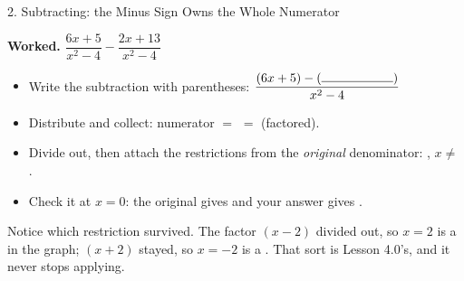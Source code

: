 \documentclass[10pt]{article}
\begin{document}
\begin{notesbox}{2. Subtracting: the Minus Sign Owns the Whole Numerator}
\begin{center}
\end{center}

\vspace{4pt}
\textbf{Worked.} \; $\dfrac{6x+5}{x^2-4}-\dfrac{2x+13}{x^2-4}$
\begin{itemize}[leftmargin=1.5em, itemsep=3pt]
  \item Write the subtraction with parentheses: $\dfrac{(6x+5)-(\rule{2.0cm}{0.4pt})}{x^2-4}$
  \item Distribute and collect: numerator $=$ \blank{3.0cm} $=$ \blank{2.4cm} (factored).
  \item Divide out, then attach the restrictions from the \emph{original} denominator:
        \blank{2.0cm}, \; $x\neq$ \blank{1.8cm}.
  \item Check it at $x=0$: the original gives \blank{1.2cm} and your answer gives \blank{1.2cm}.
\end{itemize}

\vspace{3pt}
Notice which restriction survived. The factor $(x-2)$ divided out, so $x=2$ is a
\blank{1.4cm} in the graph; $(x+2)$ stayed, so $x=-2$ is a \blank{1.4cm}. That sort is Lesson 4.0's,
and it never stops applying.
\end{notesbox}
\end{document}
